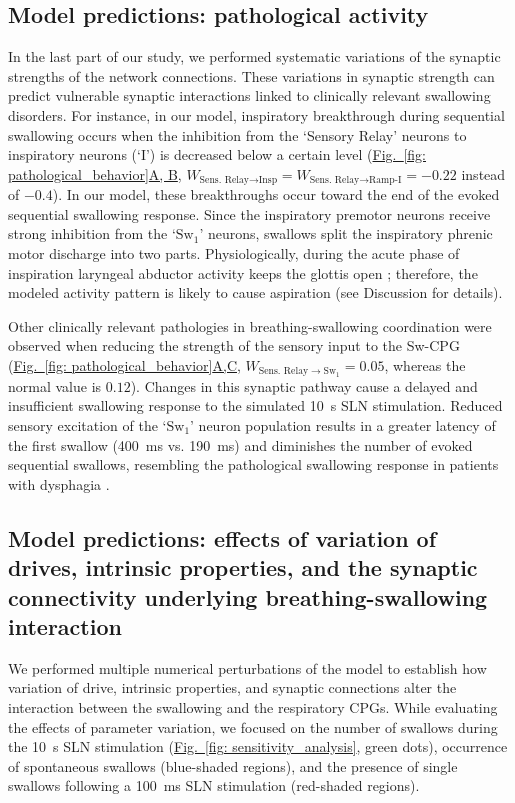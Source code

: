 \documentclass[pdflatex,sn-mathphys-ay]{sn-jnl}%
\renewcommand{\figureautorefname}{Fig.}
\newcommand{\Figref}[2][]{\hyperref[#2]{\figureautorefname~\ref*{#2}#1}}
\theoremstyle{thmstyleone}%
\theoremstyle{thmstyletwo}%
\theoremstyle{thmstylethree}%
\begin{document}
\subsection{Model predictions: pathological activity}
In the last part of our study, we performed systematic variations of the synaptic strengths of the network connections. These variations in synaptic strength can predict vulnerable synaptic interactions linked to clinically relevant swallowing disorders. For instance, in our model, inspiratory breakthrough during sequential swallowing occurs when the inhibition from the `Sensory Relay' neurons to inspiratory neurons (`I') is decreased below a certain level (\Figref[A, B]{fig: pathological_behavior}, $W_{\text{Sens. Relay} \to \text{Insp}} = W_{\text{Sens. Relay} \to \text{Ramp-I}} = -0.22$ instead of $-0.4$). In our model, these breakthroughs occur toward the end of the evoked sequential swallowing response. Since the inspiratory premotor neurons receive strong inhibition from the `$\text{Sw}_1$' neurons, swallows split the inspiratory phrenic motor discharge into two parts. Physiologically, during the acute phase of inspiration laryngeal abductor activity keeps the glottis open \citep{dutschmann2002glycinergic, dutschmann2002inhibitory}; therefore, the modeled activity pattern is likely to cause aspiration (see Discussion for details). 

Other clinically relevant pathologies in breathing-swallowing coordination were observed when reducing the strength of the sensory input to the Sw-CPG (\Figref[A,C]{fig: pathological_behavior}, $W_{\text{Sens. Relay} \to \text{Sw}_1} = 0.05$, whereas the normal value is $0.12$). Changes in this synaptic pathway cause a delayed and insufficient swallowing response to the simulated 10~s SLN stimulation. Reduced sensory excitation of the `$\text{Sw}_1$' neuron population results in a greater latency of the first swallow (400~ms vs. 190~ms) and diminishes the number of evoked sequential swallows, resembling the pathological swallowing response in patients with dysphagia \citep{daniels1997role}.

\subsection{Model predictions: effects of variation of drives, intrinsic properties, and the synaptic connectivity underlying breathing-swallowing interaction}
We performed multiple numerical perturbations of the model to establish how variation of drive, intrinsic properties, and synaptic connections alter the interaction between the swallowing and the respiratory CPGs. While evaluating the effects of parameter variation, we focused on the number of swallows during the 10~s SLN stimulation (\Figref[]{fig: sensitivity_analysis}, green dots), occurrence of spontaneous swallows (blue-shaded regions), and the presence of single swallows following a 100~ms SLN stimulation (red-shaded regions).
\end{document}
